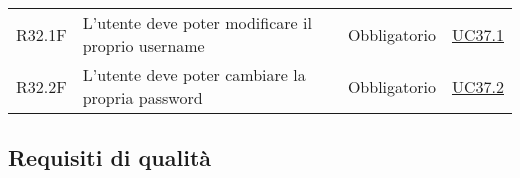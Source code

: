 \begin{center}
\begin{longtable}[!h]{p{50px} p{245px} p{75px} p{50px}}
        R32.1F                                & L'utente deve poter modificare il proprio username                                                                                                  & Obbligatorio             & \hyperref[sec:UC37.1]{UC37.1}                  \\
        R32.2F                                & L'utente deve poter cambiare la propria password                                                                                                    & Obbligatorio             & \hyperref[sec:UC37.2]{UC37.2}                  \\
    \end{longtable}
\end{center}

\subsection{Requisiti di qualità}
